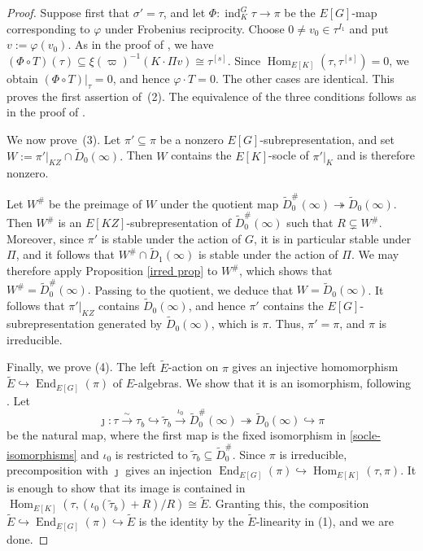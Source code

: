 \documentclass[a4paper,10pt,twoside]{amsart}
\newcommand{\M}{\widetilde{D}_0^\#(\infty)}
\DeclareMathOperator{\End}{End}
\DeclareMathOperator{\Hom}{Hom}
\theoremstyle{definition}
\numberwithin{equation}{section}
\begin{document}
\begin{proof}
Suppose first that \(\sigma'=\tau\), and let
\(\Phi:\operatorname{ind}_K^G\tau\to\pi\)
be the \(E[G]\)-map corresponding to \(\varphi\) under
Frobenius reciprocity.
Choose \(0\neq v_0\in\tau^{I_1}\) and put \(v:=\varphi(v_0)\).
As in the proof of \cite[Lemma~4.1]{GLS23}, we have
\(
(\Phi\circ T)(\tau)\subseteq \xi(\varpi)^{-1}(K\cdot\Pi v) \cong\tau^{[s]}\).
Since \(\operatorname{Hom}_{E[K]}(\tau,\tau^{[s]})=0\),
we obtain \((\Phi\circ T)|_\tau=0\), and hence
\(\varphi\cdot T=0\).
The other cases are identical.
This proves the first assertion of~\textup{(2)}.
The equivalence of the three conditions follows as in the proof
of \cite[Theorem~3.1(2)]{Le24}.


We now prove~(3). Let $\pi' \subseteq \pi$ be a nonzero $E[G]$-subrepresentation, and set $W := \pi'|_{KZ} \cap \widetilde{D}_0(\infty).
$ Then $W$ contains the $E[K]$-socle of $\pi'|_K$ and is therefore nonzero.

Let $W^\#$ be the preimage of $W$ under the quotient map 
$\widetilde{D}_0^\#(\infty) \twoheadrightarrow \widetilde{D}_0(\infty)$. 
Then $W^\#$ is an $E[KZ]$-subrepresentation of $\widetilde{D}_0^\#(\infty)$ such that $R\subsetneq W^\#$. Moreover, since $\pi'$ is stable under the action of $G$, it is in particular stable under $\Pi$, and it follows that $W^\# \cap \widetilde{D}_1(\infty)
$ is stable under the action of $\Pi$. We may therefore apply Proposition \ref{irred prop} to $W^\#$, which shows that $W^\# = \widetilde{D}_0^\#(\infty).$ Passing to the quotient, we deduce that $W = \widetilde{D}_0(\infty)$.
It follows that $\pi'|_{KZ}$ contains $\widetilde{D}_0(\infty)$, and hence $\pi'$ contains the $E[G]$-subrepresentation generated by $\widetilde{D}_0(\infty)$, which is $\pi$. Thus, $\pi' = \pi$, and $\pi$ is irreducible.


Finally, we prove (4). The left \(\widetilde E\)-action on \(\pi\) gives an
injective homomorphism \(\widetilde E\hookrightarrow \End_{E[G]}(\pi)\) of
\(E\)-algebras. We show that it is an isomorphism, following
\cite[Theorem~3.1(4)]{Le24}. Let
\[
\jmath:\tau\xrightarrow{\sim}\tau_b
\hookrightarrow \widetilde{\tau}_b
\xrightarrow{\ \iota_0\ } \M
\twoheadrightarrow \widetilde D_0(\infty)
\hookrightarrow \pi
\]
be the natural map, where the first map is the fixed isomorphism in
\eqref{socle-isomorphisms} and \(\iota_0\) is restricted
to \(\widetilde\tau_b\subseteq\widetilde D_0^\#\). Since \(\pi\) is irreducible, precomposition with
\(\jmath\) gives an injection \(
\End_{E[G]}(\pi)\hookrightarrow \Hom_{E[K]}(\tau,\pi)
\). It is enough to show that its image is contained in
\(\Hom_{E[K]}(\tau,(\iota_0(\widetilde{\tau}_b)+R)/R)\cong
\widetilde E\). Granting this, the composition
\(
\widetilde E\hookrightarrow \End_{E[G]}(\pi)\hookrightarrow \widetilde E
\) is the identity by the \(\widetilde E\)-linearity in (1), and we are done.


\end{proof}
\end{document}
